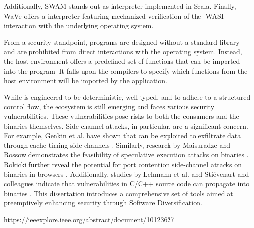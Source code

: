 Additionally, SWAM stands out as \Wasm interpreter implemented in Scala. 
Finally, WaVe\cite{wave} offers a \Wasm interpreter featuring mechanized verification of the \Wasm-WASI interaction with the underlying operating system.


From a security standpoint, \Wasm programs are designed without a standard library and are prohibited from direct interactions with the operating system. Instead, the host environment offers a predefined set of functions that can be imported into the \Wasm program. 
It falls upon the compilers to specify which functions from the host environment will be imported by the \Wasm application.


While \Wasm is engineered to be deterministic, well-typed, and to adhere to a structured control flow, the ecosystem is still emerging and faces various security vulnerabilities. 
These vulnerabilities pose risks to both the consumers and the \Wasm binaries themselves. 
Side-channel attacks, in particular, are a significant concern. 
For example, Genkin et al. have shown that \Wasm can be exploited to exfiltrate data through cache timing-side channels \cite{Genkin2018DrivebyKC}. 
Similarly, research by Maisuradze and Rossow demonstrates the feasibility of speculative execution attacks on \Wasm binaries \cite{ret2spec}. 
Rokicki \etal further reveal the potential for port contention side-channel attacks on \Wasm binaries in browsers \cite{10.1145/3488932.3517411}.
Additionally, studies by Lehmann et al. and Stiévenart and colleagues indicate that vulnerabilities in C/C++ source code can propagate into \Wasm binaries \cite{usenixWasm2020, DeRoover2022}. 
This dissertation introduces a comprehensive set of tools aimed at preemptively enhancing \Wasm security through Software Diversification.


 \url{https://ieeexplore.ieee.org/abstract/document/10123627}